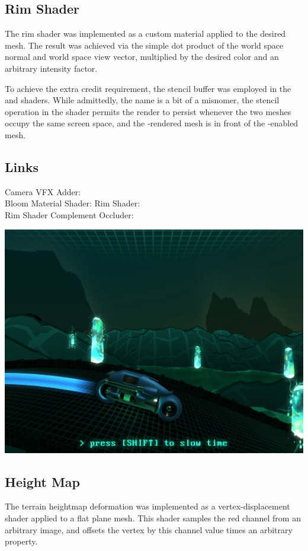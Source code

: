 \documentclass[12pt]{article}
\begin{document}
\subsection*{Rim Shader}
The rim shader was implemented as a custom material applied to the desired mesh. The result was achieved via the simple dot product of the world space normal and world space view vector, multiplied by the desired color and an arbitrary intensity factor.

To achieve the extra credit requirement, the stencil buffer was employed in the  and  shaders. While admittedly, the name is a bit of a misnomer, the stencil operation in the  shader permits the  render to persist whenever the two meshes occupy the same screen space, and the -rendered mesh is in front of the -enabled mesh.

\subsection*{Links}
Camera VFX Adder: \\
Bloom Material Shader: 
Rim Shader: \\
Rim Shader Complement Occluder: 

\begin{center}
	\includegraphics[width=0.5\linewidth]{part2.png}
\end{center}

\subsection*{Height Map}
The terrain heightmap deformation was implemented as a vertex-displacement shader applied to a flat plane mesh. This shader samples the red channel from an arbitrary image, and offsets the vertex by this channel value times an arbitrary  property.
\end{document}
